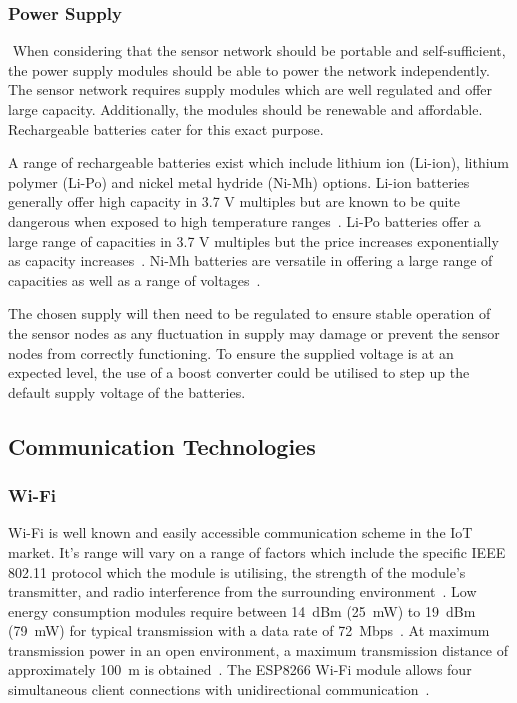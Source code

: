 \documentclass[10pt,twocolumn]{witseiepaper}
\begin{document}
		\subsubsection{Power Supply} $   $
			When considering that the sensor network should be portable and self-sufficient, the power supply modules should be able to power the network independently. The sensor network requires supply modules which are well regulated and offer large capacity. Additionally, the modules should be renewable and affordable. Rechargeable batteries cater for this exact purpose.

			A range of rechargeable batteries exist which include lithium ion (Li-ion), lithium polymer (Li-Po) and nickel metal hydride (Ni-Mh) options. Li-ion batteries generally offer high capacity in 3.7 V multiples but are known to be quite dangerous when exposed to high temperature ranges~\cite{li-ion}. Li-Po batteries offer a large range of capacities in 3.7 V multiples but the price increases exponentially as capacity increases~\cite{li-po}. Ni-Mh batteries are versatile in offering a large range of capacities as well as a range of voltages~\cite{ni-mh}.

			The chosen supply will then need to be regulated to ensure stable operation of the sensor nodes as any fluctuation in supply may damage or prevent the sensor nodes from correctly functioning. To ensure the supplied voltage is at an expected level, the use of a boost converter could be utilised to step up the default supply voltage of the batteries.
	
	\subsection{Communication Technologies}
		\subsubsection{Wi-Fi}
			Wi-Fi is well known and easily accessible communication scheme in the IoT market. It's range will vary on a range of factors which include the specific IEEE 802.11 protocol which the module is utilising, the strength of the module's transmitter, and radio interference from the surrounding environment~\cite{802.11}. Low energy consumption modules require between 14~dBm (25~mW) to 19~dBm (79~mW) for typical transmission with a data rate of 72~Mbps~\cite{esp12e}. At maximum transmission power in an open environment, a maximum transmission distance of approximately 100~m is obtained~\cite{esp12e}. The ESP8266 Wi-Fi module allows four simultaneous client connections with unidirectional communication~\cite{esp12e}.
\end{document}
